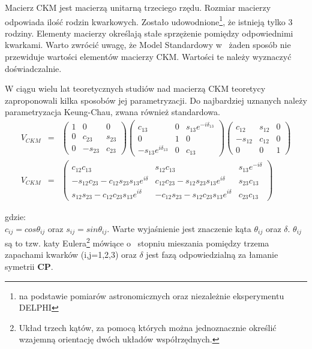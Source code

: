 Macierz CKM jest macierzą unitarną trzeciego rzędu. Rozmiar macierzy odpowiada ilość rodzin kwarkowych. Zostało udowodnione\footnote{na podstawie pomiarów astronomicznych oraz niezależnie eksperymentu DELPHI\cite{delphi} }, że istnieją tylko 3 rodziny. Elementy macierzy określają stałe sprzężenie pomiędzy odpowiednimi kwarkami. Warto zwrócić uwagę, że Model Standardowy w~ żaden sposób nie przewiduje wartości elementów macierzy CKM. Wartości te należy wyznaczyć doświadczalnie. 

W ciągu wielu lat teoretycznych studiów nad macierzą CKM teoretycy zaproponowali kilka sposobów jej parametryzacji. Do najbardziej uznanych należy parametryzacja Keung-Chau, zwana również standardowa. 
\begin{eqnarray}
V_{CKM}&=&\begin{pmatrix} 1 & 0 & 0 \\ 0 & c_{23} & s_{23} \\ 0 & -s_{23} & c_{23} \end{pmatrix}
 \begin{pmatrix} c_{13} & 0 & s_{13}e^{-i\delta_{13}} \\ 0 & 1 & 0 \\ -s_{13}e^{i\delta_{13}} & 0 & c_{13} \end{pmatrix}
 \begin{pmatrix} c_{12} & s_{12} & 0 \\ -s_{12} & c_{12} & 0 \\ 0 & 0 & 1 \end{pmatrix} \nonumber \\
V_{CKM}&=&\begin{pmatrix}
c_{12}c_{13}&s_{12}c_{13}& s_{13}e^{-i\delta} \\
 -s_{12}c_{23}-c_{12}s_{23}s_{13}e^{i\delta} & c_{12}c_{23}-s_{12}s_{23}s_{13}e^{i\delta}  & s_{23}c_{13}\\ s_{12}s_{23}-c_{12}c_{23}s_{13}e^{i\delta} & -c_{12}s_{23}-s_{12}c_{23}s_{13}e^{i\delta} & c_{23}c_{13}
\end{pmatrix}
\end{eqnarray}

gdzie:\\
$c_{ij}=cos\theta_{ij}$ oraz $s_{ij}=sin\theta_{ij}$. Warte wyjaśnienie jest znaczenie kąta $\theta_{ij}$ oraz $\delta$. $\theta_{ij}$ są to tzw. katy Eulera\footnote{Układ trzech kątów, za pomocą których można jednoznacznie określić wzajemną orientację dwóch układów współrzędnych.} mówiące o~ stopniu mieszania pomiędzy trzema zapachami kwarków (i,j=1,2,3) oraz $\delta$ jest fazą odpowiedzialną za łamanie symetrii \textbf{CP}.

